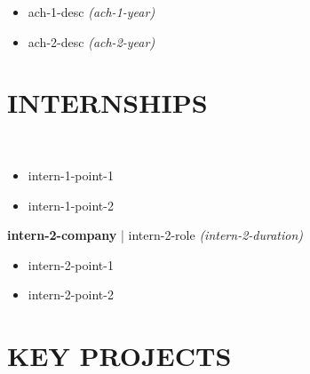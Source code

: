 \documentclass[11pt,usenames,dvipsnames]{article}
\newcommand{\xfilll}[2][1ex]{\hfill}
\begin{document}
\vspace{-3pt}
\begin{itemize}[label=\textcolor{myblue}{\textbullet},itemsep = -1.15 mm, leftmargin=6mm]
\item {{{ach-1-desc}}} \hfill {\em({{{ach-1-year}}})}
\item {{{ach-2-desc}}} \hfill {\em({{{ach-2-year}}})}


\end{itemize}
\vspace{-10pt}


\section*{\large \textrm{\textbf{\color{myblue}INTERNSHIPS\xfilll[0pt]{0.1pt}}}}
\vspace{-3pt}

\\
\vspace{-3pt}
\begin{itemize}[label=\textcolor{myblue}{\textbullet},itemsep = -1.15 mm, leftmargin=6mm]
\item {{{intern-1-point-1}}}
\item {{{intern-1-point-2}}}
\end{itemize}

\textbf{ {{{intern-2-company}}} } | {{{intern-2-role}}} \hfill{\em({{{intern-2-duration}}})}\\
\vspace{-3pt}
\begin{itemize}[label=\textcolor{myblue}{\textbullet},itemsep = -1.15 mm, leftmargin=6mm]
\item {{{intern-2-point-1}}}
\item {{{intern-2-point-2}}}
\end{itemize}

\vspace{-10pt}


\section*{\large \textrm{\textbf{\color{myblue}KEY PROJECTS\xfilll[0pt]{0.1pt}}}}
\vspace{-3pt}
\end{document}
